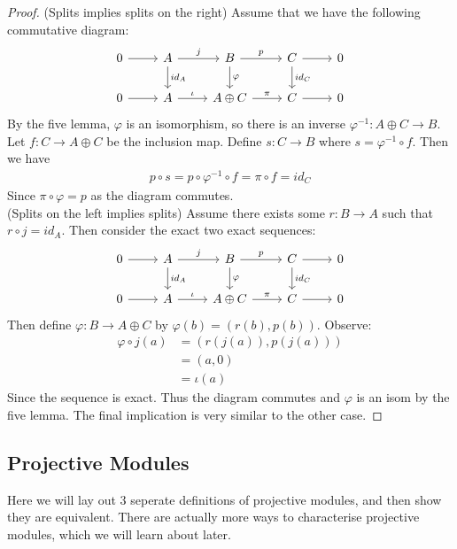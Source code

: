 \documentclass[12pt]{book}
\theoremstyle{definition}
\begin{document}
\begin{proof}
    \noindent (Splits implies splits on the right)
    Assume that we have the following commutative diagram: 
        \[
        \begin{tikzcd}
        0 \arrow[r] & A \arrow[r, "j"] \arrow[d, "id_A"] 
        & B \arrow[r, "p"] \arrow[d, "\varphi"] 
        & C \arrow[r] \arrow[d, "id_C"] 
        & 0 \\
        0 \arrow[r] & A \arrow[r, "\iota"] 
        & A \oplus C \arrow[r, "\pi"] 
        & C \arrow[r] 
        & 0
        \end{tikzcd}
        \]
        By the five lemma, $\varphi$ is an isomorphism, so there is an inverse $\varphi^{-1} : A \oplus C \to B$. Let $f : C \to A \oplus C$ be the inclusion map. Define $s: C \to B$ where $ s = \varphi^{-1} \circ f$. Then we have 
        \begin{align*}
            p \circ s = p \circ \varphi^{-1} \circ f = \pi \circ f = id_C
        \end{align*}
        Since $\pi \circ \varphi = p$ as the diagram commutes.\\
        \noindent (Splits on the left implies splits) Assume there exists some $r : B \to A$ such that $r \circ j = id_A$. Then consider the exact two exact sequences: 
        \[
        \begin{tikzcd}
        0 \arrow[r] & A \arrow[r, "j"] \arrow[d, "id_A"] 
        & B \arrow[r, "p"] \arrow[d, "\varphi"] 
        & C \arrow[r] \arrow[d, "id_C"] 
        & 0 \\
        0 \arrow[r] & A \arrow[r, "\iota"] 
        & A \oplus C \arrow[r, "\pi"] 
        & C \arrow[r] 
        & 0
        \end{tikzcd}
        \]
        Then define $\varphi : B \to A \oplus C$ by $\varphi(b) = (r(b), p(b))$. Observe: 
        \begin{align*}
            \varphi \circ j (a) &= (r(j(a)), p(j(a)))\\
                                &= (a, 0)\\
                                &= \iota(a)
        \end{align*}
        Since the sequence is exact. Thus the diagram commutes and $\varphi$ is an isom by the five lemma. The final implication is very similar to the other case. 
\end{proof}

\subsection{Projective Modules}
Here we will lay out 3 seperate definitions of projective modules, and then show they are equivalent. There are actually more ways to characterise projective modules, which we will learn about later. 
\end{document}

